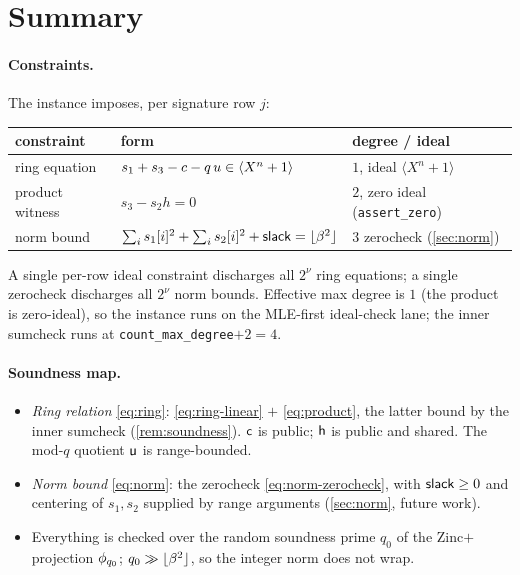 \section{Summary}\label{sec:summary}

\paragraph{Constraints.}
The instance imposes, per signature row $j$:
\begin{center}
\begin{tabular}{@{}lll@{}}
\toprule
constraint & form & degree / ideal \\
\midrule
ring equation
  & $s_1 + s_3 - c - q\,u \in \langle X^{n}+1\rangle$
  & $1$, ideal $\langle X^n{+}1\rangle$ \\
product witness
  & $s_3 - s_2 h = 0$
  & $2$, zero ideal (\texttt{assert\_zero}) \\
norm bound
  & $\sum_i s_1[i]^2 + \sum_i s_2[i]^2 + \mathsf{slack} = \lfloor \beta^2 \rfloor$
  & $3$ zerocheck (\cref{sec:norm}) \\
\bottomrule
\end{tabular}
\end{center}
A single per-row ideal constraint discharges all $2^{\nu}$ ring equations;
a single zerocheck discharges all $2^{\nu}$ norm bounds. Effective max
degree is $1$ (the product is zero-ideal), so the instance runs on the
MLE-first ideal-check lane; the inner sumcheck runs at
\texttt{count\_max\_degree}$+2 = 4$.

\paragraph{Soundness map.}
\begin{itemize}[leftmargin=1.5em]
  \item \emph{Ring relation} \eqref{eq:ring}: \eqref{eq:ring-linear}
  $+$ \eqref{eq:product}, the latter bound by the inner sumcheck
  (\cref{rem:soundness}). $\mathsf{c}$ is public; $\mathsf{h}$ is public and
  shared. The mod-$q$ quotient $\mathsf{u}$ is range-bounded.
  \item \emph{Norm bound} \eqref{eq:norm}: the zerocheck
  \eqref{eq:norm-zerocheck}, with $\mathsf{slack}\ge 0$ and centering of
  $s_1,s_2$ supplied by range arguments (\cref{sec:norm}, future work).
  \item Everything is checked over the random soundness prime $q_0$ of
  the Zinc$+$ projection $\phi_{q_0}$; $q_0 \gg \lfloor \beta^2 \rfloor$, so the integer
  norm does not wrap.
\end{itemize}

